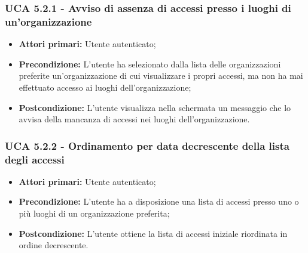 \subsubsection{UCA 5.2.1 - Avviso di assenza di accessi presso i luoghi di un'organizzazione}
\begin{itemize}
    \item \textbf{Attori primari:} Utente autenticato;
    \item \textbf{Precondizione:} L'utente ha selezionato dalla lista delle organizzazioni preferite un'organizzazione di cui visualizzare i propri accessi, ma non ha mai effettuato accesso ai luoghi dell'organizzazione;
    \item \textbf{Postcondizione:} L'utente visualizza nella schermata un messaggio che lo avvisa della mancanza di accessi nei luoghi dell'organizzazione.
\end{itemize}

% 	
\subsubsection{UCA 5.2.2 - Ordinamento per data decrescente della lista degli accessi}
\begin{itemize}
    \item \textbf{Attori primari:} Utente autenticato;
    \item \textbf{Precondizione:} L'utente ha a disposizione una lista di accessi presso uno o più luoghi di un organizzazione preferita;
    \item \textbf{Postcondizione:} L'utente ottiene la lista di accessi iniziale riordinata in ordine decrescente.
\end{itemize}

